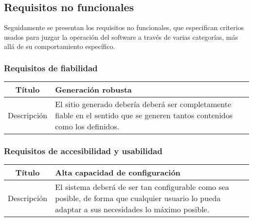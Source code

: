 \subsection{Requisitos no funcionales}

Seguidamente se presentan los requisitos no funcionales, que especifican criterios
usados para juzgar la operación del software a través de varias categorías, más
allá de su comportamiento específico.

\subsubsection{Requisitos de fiabilidad}

\begin{center}

    \begin{tabularx}{\textwidth}{|c|X|}
        \hline
        Título & Generación robusta\\

        \hline

        Descripción & El sitio generado debería deberá ser completamente fiable
        en el sentido que se generen tantos contenidos como los definidos.\\

        \hline
    \end{tabularx}
\end{center}

\subsubsection{Requisitos de accesibilidad y usabilidad}

\begin{center}

    \begin{tabularx}{\textwidth}{|c|X|}
        \hline
        Título & Alta capacidad de configuración\\

        \hline

        Descripción & El sistema deberá de ser tan configurable como sea
        posible, de forma que cualquier usuario lo pueda adaptar a sus
        necesidades lo máximo posible.\\

        \hline
    \end{tabularx}
\end{center}

